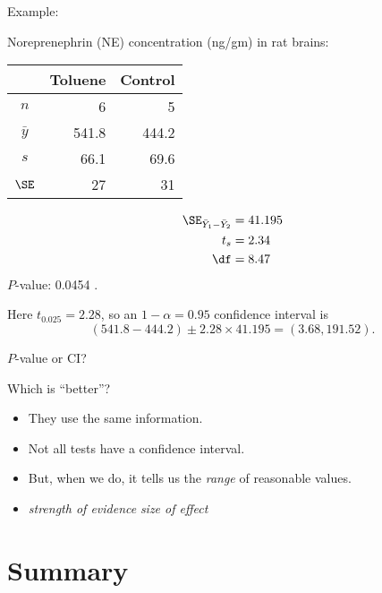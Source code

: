 \begin{frame}{Example: }

    Noreprenephrin (NE) concentration (ng/gm) in rat brains:
    \begin{center}
      \begin{tabular}{c|rr}
            & Toluene & Control \\
          \hline
          $n$ & 6 & 5 \\
          $\bar y$ & 541.8 & 444.2 \\
          $s$  & 66.1 & 69.6 \\
          $\SE$ & 27 & 31 \\
     \end{tabular}
   \end{center}


     \begin{align*}
         \SE_{\bar Y_1 - \bar Y_2} &= 41.195 \\
         t_s &= 2.34  \\
         \df &= 8.47 
     \end{align*}
     $P$-value: 0.0454 .


  \vspace{2em}

  Here $t_{0.025} = 2.28$, so an $1-\alpha=0.95$ confidence interval is
  \[  (541.8-444.2) \pm 2.28 \times 41.195 = (3.68,191.52) . \]

\end{frame}

\begin{frame}{$P$-value or CI?}

  Which is ``better''?

  \pause
  \begin{itemize}
      \item They use the same information.
      \item Not all tests have a confidence interval.
      \item But, when we do, it tells us the \emph{range} of reasonable values.
      \item \emph{strength of evidence}  \emph{size of effect}
  \end{itemize}

\end{frame}



\section<article>{Summary}
